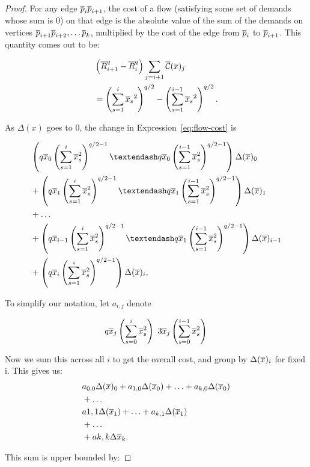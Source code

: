 \begin{proof} For any edge $\overline{p}_i\overline{p}_{i+1}$, the cost of a flow (satisfying
some set of demands whose sum is $0$) on that edge is the absolute value of
the sum of the demands on vertices $\overline{p}_{i+1} \overline{p}_{i+2}, \ldots \overline{p}_k$,
multiplied by the cost of the edge from $\overline{p}_i$ to $\overline{p}_{i+1}$. This
quantity comes out to be:

\begin{align} &\left(\overline{R}_{i+1}^q-\overline{R}_{i}^q \right) \sum_{j=i+1} \overline{\mathcal{C}}(\overline{x})_j
\\
\label{eq:flow-cost}
&=\left(\sum_{s=1}^i {\overline{x}_s}^2\right)^{q/2} -\left(\sum_{s=1}^{i-1}
{\overline{x}_s}^2\right)^{q/2}.
\end{align}

As $\Delta(x)$ goes to $0$, the change in Expression~\ref{eq:flow-cost} is

\begin{align}
&
\left(q\xr_0 \left(\sum_{s=1}^i \xr_s^2 \right)^{q/2-1} –
q\xr_0\left(\sum_{s=1}^{i-1} \xr_s^2 \right)^{q/2-1} \right) \Delta(\xr)_0
\\
&+
\left(q\xr_1 \left(\sum_{s=1}^i \xr_s^2 \right)^{q/2-1} –
q\xr_1\left(\sum_{s=1}^{i-1}\xr_s^2 \right)^{q/2-1} \right) \Delta(\xr)_1
\\
&+ \ldots
\\
&+
\left(q\xr_{i-1} \left(\sum_{s=1}^i \xr_s^2 \right)^{q/2-1} –
q\xr_1\left(\sum_{s=1}^{i-1}\xr_s^2 \right)^{q/2-1}
\right)\Delta(\xr)_{i-1}
\\
&+
\left(q\xr_i \left(\sum_{s=1}^i \xr_s^2
\right)^{q/2-1}\right)\Delta(\xr)_i,
\end{align}

To simplify our notation, let $a_{i,j}$ denote

\[
q\overline{x}_j\left(\sum_{s=0}^i \overline{x}_s^2\right) \ 3\overline{x}_j\left(\sum_{s=0}^{i-1}
\overline{x}_s^2 \right)
\]

Now we sum this across all $i$ to get the overall cost, and group by
$\Delta(\overline{x})_i$ for fixed i. This gives us:
\begin{align}
&a_{0,0} \Delta(\overline{x})_0 + a_{1,0} \Delta(\overline{x}_0) + \ldots + a_{k, 0}
\Delta(\overline{x}_0)
\\
&+ \ldots
\\
&a{1,1} \Delta(\overline{x}_1) + \ldots + a_{k, 1} \Delta(\overline{x}_1)
\\
&+ \ldots
\\
&+ a{k,k} \Delta{\overline{x}_k}.
\end{align}

This sum is upper bounded by:


\end{proof}
